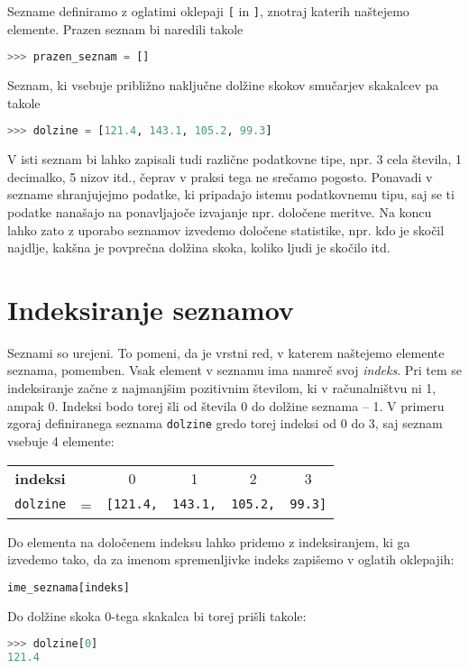 Sezname definiramo z oglatimi oklepaji \texttt{[} in \texttt{]}, znotraj katerih naštejemo elemente. Prazen seznam bi naredili takole
\begin{lstlisting}[language=Python, showstringspaces=false]
>>> prazen_seznam = []
\end{lstlisting}
Seznam, ki vsebuje približno naključne dolžine skokov smučarjev skakalcev pa takole
\begin{lstlisting}[language=Python, showstringspaces=false]
>>> dolzine = [121.4, 143.1, 105.2, 99.3]
\end{lstlisting}
V isti seznam bi lahko zapisali tudi različne podatkovne tipe, npr. 3 cela števila, 1 decimalko, 5 nizov itd., čeprav v praksi tega ne srečamo pogosto. Ponavadi v sezname shranjujejmo podatke, ki pripadajo istemu podatkovnemu tipu, saj se ti podatke nanašajo na ponavljajoče izvajanje npr. določene meritve. Na koncu lahko zato z uporabo seznamov izvedemo določene statistike, npr. kdo je skočil najdlje, kakšna je povprečna dolžina skoka, koliko ljudi je skočilo itd.

\section{Indeksiranje seznamov}
Seznami so urejeni. To pomeni, da je vrstni red, v katerem naštejemo elemente seznama, pomemben. Vsak element v seznamu ima namreč svoj \emph{indeks}. Pri tem se indeksiranje začne z najmanjšim pozitivnim številom, ki v računalništvu ni 1, ampak 0. Indeksi bodo torej šli od števila 0 do dolžine seznama -- 1. V primeru zgoraj definiranega seznama \texttt{dolzine} gredo torej indeksi od 0 do 3, saj seznam vsebuje 4 elemente:

\begin{tabular}{cccccc}
\textbf{indeksi} & & 0 & 1 & 2 & 3\\
\texttt{dolzine} & = & \texttt{[121.4,}& \texttt{143.1,} & \texttt{105.2,} & \texttt{99.3]}
\end{tabular}

Do elementa na določenem indeksu lahko pridemo z indeksiranjem, ki ga izvedemo tako, da za imenom spremenljivke indeks zapišemo v oglatih oklepajih:
\begin{lstlisting}[language=Python, showstringspaces=false]
ime_seznama[indeks]
\end{lstlisting}
Do dolžine skoka 0-tega skakalca bi torej prišli takole:
\begin{lstlisting}[language=Python, showstringspaces=false]
>>> dolzine[0]
121.4
\end{lstlisting}


